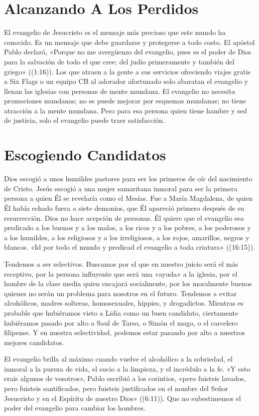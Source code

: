 \documentclass[12pt, twoside, openright]{book}
\begin{document}
\section{Alcanzando A Los Perdidos}
El evangelio de Jesucristo es el mensaje más precioso que este mundo ha conocido. Es un mensaje que debe guardarse y protegerse a todo costo. El apóstol Pablo declaró, «Porque no me avergüenzo del evangelio, pues es el poder de Dios para la salvación de todo el que cree; del judío primeramente y también del griego» ((1:16)). Los que atraen a la gente a sus servicios ofreciendo viajes gratis a Six Flags o un equipo CB al adorador afortunado solo abaratan el evangelio y llenan las iglesias con personas de mente mundana. El evangelio no necesita promociones mundanas; no se puede mejorar por esquemas mundanas; no tiene atracción a la mente mundana. Pero para esa persona quien tiene hambre y sed de justicia, solo el evangelio puede traer satisfacción. 

\section{Escogiendo Candidatos}
Dios escogió a unos humildes pastores para ser los primeros de oír del nacimiento de Cristo. Jesús escogió a una mujer samaritana inmoral para ser la primera persona a quien Él se revelaría como el Mesías. Fue a María Magdalena, de quien Él había echado fuera a siete demonios, que Él apareció primero después de su resurrección. Dios no hace acepción de personas. Él quiere que el evangelio sea predicado a los buenos y a los malos, a los ricos y a los pobres, a los poderosos y a los humildes, a los religiosos y a los irreligiosos, a los rojos, amarillos, negros y blancos. «Id por todo el mundo y predicad el evangelio a toda criatura» ((16:15)).

Tendemos a ser selectivos. Buscamos por el que en nuestro juicio será el más receptivo, por la persona influyente que será una «ayuda» a la iglesia, por el hombre de la clase media quien encajará socialmente, por los moralmente buenos quienes no serán un problema para nosotros en el futuro. Tendemos a evitar alcohólicos, madres solteras, homosexuales, hippies, y drogadictos. Mientras es probable que hubiéramos visto a Lidia como un buen candidato, ciertamente hubiéramos pasado por alto a Saul de Tarso, o Simón el mago, o el carcelero filipense. Y en nuestra selectividad, podemos estar pasando por alto a nuestros mejores candidatos.

El evangelio brilla al máximo cuando vuelve el alcohólico a la sobriedad, el inmoral a la pureza de vida, el sucio a la limpieza, y el incrédulo a la fe. «Y esto erais algunos de vosotros», Pablo escribió a los corintios, «pero fuisteis lavados, pero fuisteis santificados, pero fuisteis justificados en el nombre del Señor Jesucristo y en el Espíritu de nuestro Dios» ((6:11)). Que no subestimemos el poder del evangelio para cambiar los hombres.
\end{document}
